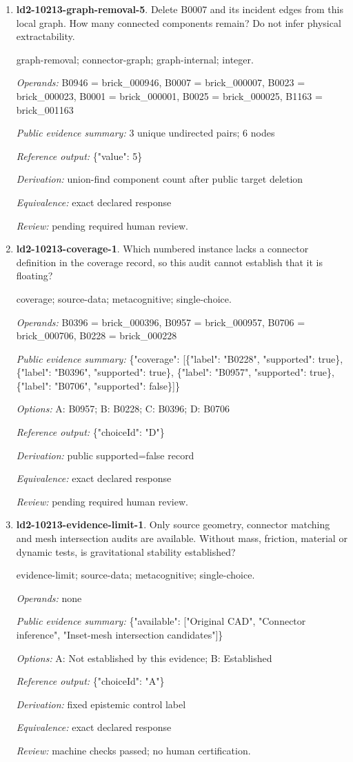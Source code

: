 \begin{enumerate}
\item \textbf{ld2-10213-graph-removal-5}. Delete B0007 and its incident edges from this local graph. How many connected components remain? Do not infer physical extractability.
\par{\small graph-removal; connector-graph; graph-internal; integer.\par\textit{Operands:} B0946 = brick\_000946, B0007 = brick\_000007, B0023 = brick\_000023, B0001 = brick\_000001, B0025 = brick\_000025, B1163 = brick\_001163\par\textit{Public evidence summary:} 3 unique undirected pairs; 6 nodes\par\textit{Reference output:} \{"value": 5\}\par\textit{Derivation:} union-find component count after public target deletion\par\textit{Equivalence:} exact declared response\par\textit{Review:} pending required human review.}
\item \textbf{ld2-10213-coverage-1}. Which numbered instance lacks a connector definition in the coverage record, so this audit cannot establish that it is floating?
\par{\small coverage; source-data; metacognitive; single-choice.\par\textit{Operands:} B0396 = brick\_000396, B0957 = brick\_000957, B0706 = brick\_000706, B0228 = brick\_000228\par\textit{Public evidence summary:} \{"coverage": [\{"label": "B0228", "supported": true\}, \{"label": "B0396", "supported": true\}, \{"label": "B0957", "supported": true\}, \{"label": "B0706", "supported": false\}]\}\par\textit{Options:} A: B0957; B: B0228; C: B0396; D: B0706\par\textit{Reference output:} \{"choiceId": "D"\}\par\textit{Derivation:} public supported=false record\par\textit{Equivalence:} exact declared response\par\textit{Review:} pending required human review.}
\item \textbf{ld2-10213-evidence-limit-1}. Only source geometry, connector matching and mesh intersection audits are available. Without mass, friction, material or dynamic tests, is gravitational stability established?
\par{\small evidence-limit; source-data; metacognitive; single-choice.\par\textit{Operands:} none\par\textit{Public evidence summary:} \{"available": ["Original CAD", "Connector inference", "Inset-mesh intersection candidates"]\}\par\textit{Options:} A: Not established by this evidence; B: Established\par\textit{Reference output:} \{"choiceId": "A"\}\par\textit{Derivation:} fixed epistemic control label\par\textit{Equivalence:} exact declared response\par\textit{Review:} machine checks passed; no human certification.}

\end{enumerate}

